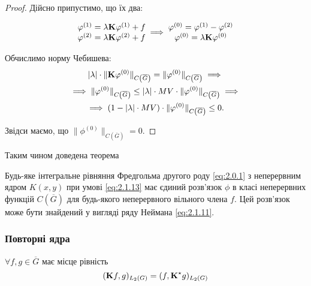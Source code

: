 \begin{proof}
	Дійсно припустимо, що їх два:

	\begin{equation*}
		\begin{matrix}
			\phi^{(1)} = \lambda \bf{K} \phi^{(1)} + f \\
			\phi^{(2)} = \lambda \bf{K} \phi^{(2)} + f
		\end{matrix}
		\implies
		\begin{matrix}
			\phi^{(0)} = \phi^{(1)} - \phi^{(2)}  \\
			\phi^{(0)} = \lambda \bf{K} \phi^{(0)}
		\end{matrix}
	\end{equation*}

	Обчислимо норму Чебишева: 
	\begin{multline*} 
		|\lambda| \cdot \|\bf{K} \phi^{(0)}\|_{C\left(\overline G\right)} = \| \phi^{(0)} \|_{C\left(\overline G\right)} \implies \\
		\implies \| \phi^{(0)} \|_{C\left(\overline G\right)} \le |\lambda| \cdot MV \cdot \|\phi^{(0)}\|_{C\left(\overline G\right)} \implies \\
		\implies (1 - |\lambda| \cdot MV) \cdot \|\phi^{(0)}\|_{C\left(\overline G\right)} \le 0.
	\end{multline*}

	Звідси маємо, що $\|\phi^{(0)}\|_{C\left(\overline G\right)} = 0$.
\end{proof}

Таким чином доведена теорема

\begin{theorem}
	Будь-яке інтегральне рівняння Фредгольма другого роду \eqref{eq:2.0.1} з неперервним ядром $K(x, y)$ при умові \eqref{eq:2.1.13} має єдиний розв'язок $\phi$ в класі неперервних функцій $C\left(\overline G\right)$ для будь-якого неперервного вільного члена $f$. Цей роз\-в'я\-зок може бути знайдений у вигляді ряду Неймана \eqref{eq:2.1.11}.
\end{theorem}

\subsubsection{Повторні ядра}

\begin{proposition}
	$\forall f, g \in \overline G$ має місце рівність 
	\begin{equation}
		\label{eq:2.1.14}
		(\bf{K}f,g)_{L_2(G)} = (f, \bf{K}^\star g)_{L_2(G)}
	\end{equation}
\end{proposition}

